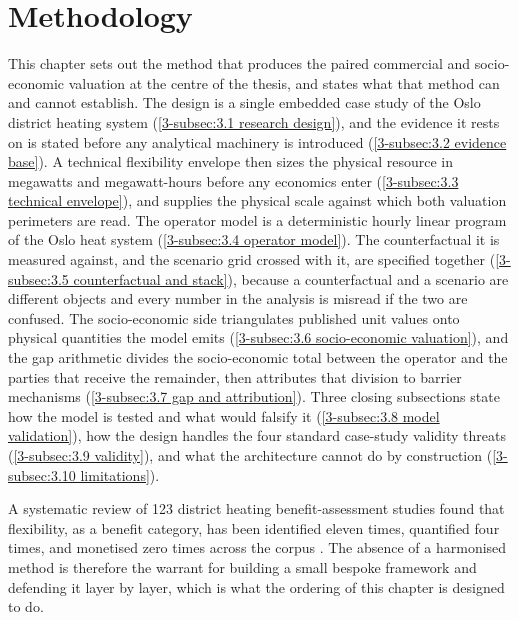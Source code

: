 \section{Methodology}
\label{3-sec:3}

This chapter sets out the method that produces the paired commercial and socio-economic valuation at the centre of the thesis, and states what that method can and cannot establish. The design is a single embedded case study of the Oslo district heating system (\autoref{3-subsec:3.1 research design}), and the evidence it rests on is stated before any analytical machinery is introduced (\autoref{3-subsec:3.2 evidence base}). A technical flexibility envelope then sizes the physical resource in megawatts and megawatt-hours before any economics enter (\autoref{3-subsec:3.3 technical envelope}), and supplies the physical scale against which both valuation perimeters are read. The operator model is a deterministic hourly linear program of the Oslo heat system (\autoref{3-subsec:3.4 operator model}). The counterfactual it is measured against, and the scenario grid crossed with it, are specified together (\autoref{3-subsec:3.5 counterfactual and stack}), because a counterfactual and a scenario are different objects and every number in the analysis is misread if the two are confused. The socio-economic side triangulates published unit values onto physical quantities the model emits (\autoref{3-subsec:3.6 socio-economic valuation}), and the gap arithmetic divides the socio-economic total between the operator and the parties that receive the remainder, then attributes that division to barrier mechanisms (\autoref{3-subsec:3.7 gap and attribution}). Three closing subsections state how the model is tested and what would falsify it (\autoref{3-subsec:3.8 model validation}), how the design handles the four standard case-study validity threats (\autoref{3-subsec:3.9 validity}), and what the architecture cannot do by construction (\autoref{3-subsec:3.10 limitations}).

A systematic review of 123 district heating benefit-assessment studies found that flexibility, as a benefit category, has been identified eleven times, quantified four times, and monetised zero times across the corpus \cite{ahmed_district_2025}. The absence of a harmonised method is therefore the warrant for building a small bespoke framework and defending it layer by layer, which is what the ordering of this chapter is designed to do.

